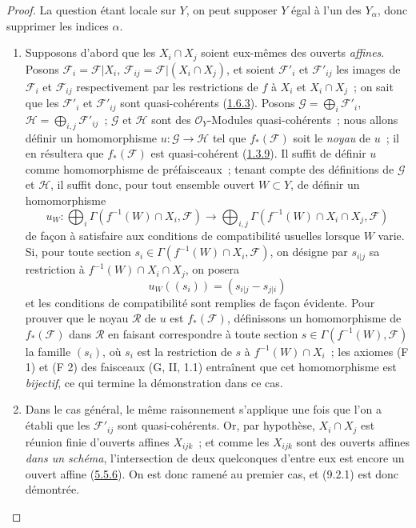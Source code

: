\begin{proof}
La question étant locale sur $Y$, on peut supposer $Y$ égal à l'un des
$Y_\alpha$, donc supprimer les indices $\alpha$.

\begin{enumerate}
\item[a)] Supposons d'abord que les $X_i\cap X_j$ soient eux-mêmes des
ouverts \emph{affines}. Posons
$\mathscr{F}_i=\mathscr{F}|X_i$,
$\mathscr{F}_{ij}=\mathscr{F}|(X_i\cap X_j)$, et soient
$\mathscr{F}'_i$ et $\mathscr{F}'_{ij}$ les images de $\mathscr{F}_i$ et
$\mathscr{F}_{ij}$ respectivement par les restrictions de $f$ à $X_i$ et
$X_i\cap X_j$~; on sait que les $\mathscr{F}'_i$ et
$\mathscr{F}'_{ij}$ sont quasi-cohérents
(\hyperref[I.1.6.3-fr]{1.6.3}). Posons
$\mathscr{G}=\bigoplus_i\mathscr{F}'_i$,
$\mathscr{H}=\bigoplus_{i,j}\mathscr{F}'_{ij}$~; $\mathscr{G}$ et
$\mathscr{H}$ sont des $\mathscr{O}_Y$-Modules quasi-cohérents~; nous allons
définir un homomorphisme $u:\mathscr{G}\to\mathscr{H}$ tel que
$f_*(\mathscr{F})$ soit le \emph{noyau} de $u$~; il en résultera que
$f_*(\mathscr{F})$ est quasi-cohérent
(\hyperref[I.1.3.9-fr]{1.3.9}). Il suffit de définir $u$
comme homomorphisme de préfaisceaux~; tenant compte des définitions de
$\mathscr{G}$ et $\mathscr{H}$, il suffit donc, pour tout ensemble ouvert
$W\subset Y$, de définir un homomorphisme
\[
  u_W:\bigoplus_i\Gamma(f^{-1}(W)\cap X_i,\mathscr{F})
  \longrightarrow
  \bigoplus_{i,j}\Gamma(f^{-1}(W)\cap X_i\cap X_j,\mathscr{F})
\]
de façon à satisfaire aux conditions de compatibilité usuelles lorsque $W$
varie. Si, pour toute section
$s_i\in\Gamma(f^{-1}(W)\cap X_i,\mathscr{F})$, on désigne par $s_{i|j}$ sa
restriction à $f^{-1}(W)\cap X_i\cap X_j$, on posera
\[
  u_W((s_i))=(s_{i|j}-s_{j|i})
\]
et les conditions de compatibilité sont remplies de façon évidente. Pour
prouver que le noyau $\mathscr{R}$ de $u$ est $f_*(\mathscr{F})$, définissons
un homomorphisme de $f_*(\mathscr{F})$ dans $\mathscr{R}$ en faisant
correspondre à toute section $s\in\Gamma(f^{-1}(W),\mathscr{F})$ la famille
$(s_i)$, où $s_i$ est la restriction de $s$ à $f^{-1}(W)\cap X_i$~; les
axiomes (F 1) et (F 2) des faisceaux (G, II, 1.1) entraînent que cet
homomorphisme est \emph{bijectif}, ce qui termine la démonstration dans ce cas.

\item[b)] Dans le cas général, le même raisonnement s'applique une fois que
l'on a établi que les $\mathscr{F}'_{ij}$ sont quasi-cohérents. Or, par
hypothèse, $X_i\cap X_j$ est réunion finie d'ouverts affines $X_{ijk}$~; et
comme les $X_{ijk}$ sont des ouverts affines \emph{dans un schéma},
l'intersection de deux quelconques d'entre eux est encore un ouvert affine
(\hyperref[I.5.5.6-fr]{5.5.6}). On est donc ramené au premier cas, et
(9.2.1) est donc démontrée.
\end{enumerate}
\end{proof}

